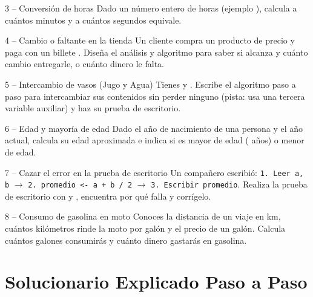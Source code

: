 \documentclass[11pt,letterpaper]{article}
\begin{document}
\begin{ejercicio}{3 -- Conversión de horas}
Dado un número entero de horas (ejemplo ), calcula a cuántos minutos y a cuántos segundos equivale.
\end{ejercicio}

\begin{ejercicio}{4 -- Cambio o faltante en la tienda}
Un cliente compra un producto de precio  y paga con un billete . Diseña el análisis y algoritmo para saber si alcanza y cuánto cambio entregarle, o cuánto dinero le falta.
\end{ejercicio}

\begin{ejercicio}{5 -- Intercambio de vasos (Jugo y Agua)}
Tienes  y . Escribe el algoritmo paso a paso para intercambiar sus contenidos sin perder ninguno (pista: usa una tercera variable auxiliar) y haz su prueba de escritorio.
\end{ejercicio}

\begin{ejercicio}{6 -- Edad y mayoría de edad}
Dado el año de nacimiento de una persona y el año actual, calcula su edad aproximada e indica si es mayor de edad ( años) o menor de edad.
\end{ejercicio}

\begin{ejercicio}{7 -- Cazar el error en la prueba de escritorio}
Un compañero escribió: \texttt{1. Leer a, b} $\rightarrow$ \texttt{2. promedio <- a + b / 2} $\rightarrow$ \texttt{3. Escribir promedio}. Realiza la prueba de escritorio con  y , encuentra por qué falla y corrígelo.
\end{ejercicio}

\begin{ejercicio}{8 -- Consumo de gasolina en moto}
Conoces la distancia de un viaje en km, cuántos kilómetros rinde la moto por galón y el precio de un galón. Calcula cuántos galones consumirás y cuánto dinero gastarás en gasolina.
\end{ejercicio}

\section{Solucionario Explicado Paso a Paso}
\end{document}
